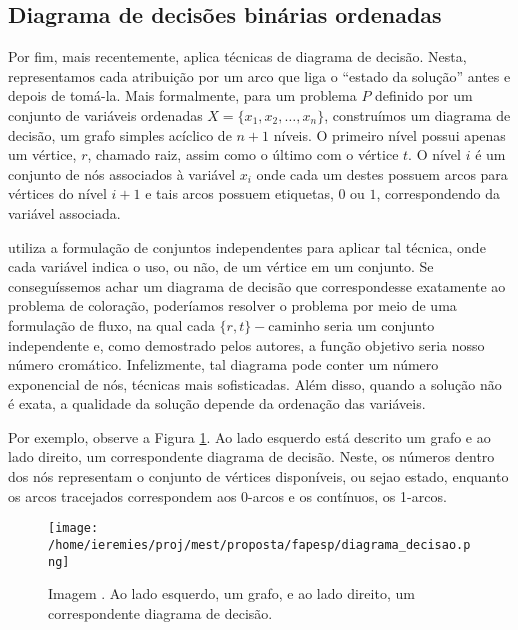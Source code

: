 \documentclass[11pt]{article}
\providecommand{\DIFaddtex}[1]{{\protect\color{blue}{#1}}} %
\providecommand{\DIFaddbegin}{} %
\providecommand{\DIFaddend}{} %
\providecommand{\DIFaddFL}[1]{\DIFadd{#1}} %
\providecommand{\DIFaddbeginFL}{} %
\providecommand{\DIFaddendFL}{} %
\providecommand{\DIFadd}[1]{\texorpdfstring{\DIFaddtex{#1}}{#1}} %
\newcommand{\DIFaddincludegraphics}[2][]{{\color{blue}\fbox{\DIFOincludegraphics[#1]{#2}}}} %
\DeclareRobustCommand{\DIFaddbegin}{\DIFOaddbegin \let\includegraphics\DIFaddincludegraphics} %
\DeclareRobustCommand{\DIFaddend}{\DIFOaddend \let\includegraphics\DIFOincludegraphics} %
\DeclareRobustCommand{\DIFaddbeginFL}{\DIFOaddbeginFL \let\includegraphics\DIFaddincludegraphics} %
\DeclareRobustCommand{\DIFaddendFL}{\DIFOaddendFL \let\includegraphics\DIFOincludegraphics} %
\begin{document}
\DIFaddbegin \DIFadd{Como demonstrado pelos autores, essa formulação apresenta-se também competitiva com as demais.
}

\DIFaddend \subsection{Diagrama de decisões binárias ordenadas}
 \DIFaddbegin \label{sec:org33d1e1f}
\DIFaddend Por fim, mais recentemente, \textcite{Hoeve2021Graphcoloringdecision} aplica técnicas de diagrama de decisão.
Nesta, representamos cada atribuição por um arco que liga o  ``estado da solução'' antes e depois de tomá-la.
Mais formalmente, para um problema \(P\) definido por um conjunto de variáveis ordenadas \(X = \{x_1,x_2,\dots ,x_n\}\), construímos um diagrama de decisão, um grafo simples acíclico de \(n+1\) níveis.
O primeiro nível possui apenas um vértice, \(r\), chamado raiz, assim como o último com o vértice \(t\).
O nível \(i\) é um conjunto de nós associados à variável \(x_i\) onde cada um destes possuem arcos para vértices do nível \(i+1\) e tais arcos possuem etiquetas, \(0\) ou \(1\), correspondendo da variável associada.

\textcite{Hoeve2021Graphcoloringdecision} utiliza a formulação de conjuntos independentes para aplicar tal técnica, onde cada variável indica o uso, ou não, de um vértice em um conjunto.
Se conseguíssemos achar um diagrama de decisão que correspondesse exatamente ao problema de coloração, poderíamos resolver o problema por meio de uma formulação de fluxo, na qual cada \(\{r,t\}-\text{caminho}\) seria um conjunto independente e, como demostrado pelos autores, a função objetivo seria nosso número cromático.
Infelizmente, tal diagrama pode conter um número exponencial de nós,  \DIFaddbegin \DIFadd{requerendo }\DIFaddend técnicas mais sofisticadas.
Além disso, quando a solução não é exata, a qualidade da solução depende da ordenação das variáveis.

Por exemplo, observe a Figura \ref{fig:diagrama_decisao}.
Ao lado esquerdo está descrito um grafo e ao lado direito, um correspondente diagrama de decisão.
Neste, os números dentro dos nós representam o conjunto de vértices disponíveis, ou seja\DIFaddbegin \DIFadd{, }\DIFaddend o estado, enquanto os arcos tracejados correspondem aos 0-arcos e os contínuos, os 1-arcos.

\begin{figure}[htbp]
\centering
 \texttt{[image: /home/ieremies/proj/mest/proposta/fapesp/diagrama\_decisao.png]}
\DIFaddendFL \caption{\label{fig:diagrama_decisao}Imagem  \DIFaddbeginFL \DIFaddFL{original por \mbox{%
\textcite{Hoeve2021Graphcoloringdecision}}\hskip0pt%
}\DIFaddendFL . Ao lado esquerdo, um grafo, e ao lado direito, um correspondente diagrama de decisão.}
\end{figure}
\end{document}
